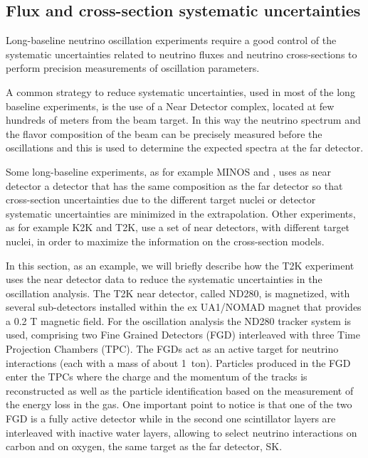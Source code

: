  

\subsection{Flux and cross-section systematic uncertainties}
\label{sec:beamsyst}

Long-baseline neutrino oscillation experiments require a good control of the systematic uncertainties related to neutrino fluxes and neutrino cross-sections to perform precision measurements of oscillation parameters. 

A common strategy to reduce systematic uncertainties, used in most of the long baseline experiments, is the use of a Near Detector complex, located at few hundreds of meters from the beam target. In this way the neutrino spectrum and the flavor composition of the beam can be precisely measured before the oscillations and this is used to determine the expected spectra at the far detector.

Some long-baseline experiments, as for example MINOS and \nova, uses as near detector a detector that has the same composition as the far detector so that cross-section uncertainties due to the different target nuclei or detector systematic uncertainties are minimized in the extrapolation. Other experiments, as for example K2K and T2K, use a set of near detectors, with different target nuclei, in order to maximize the information on the cross-section models.

In this section, as an example, we will briefly describe how the T2K experiment uses the near detector data to reduce the systematic uncertainties in the oscillation analysis. The T2K near detector, called ND280, is magnetized, with several sub-detectors installed within the ex UA1/NOMAD magnet that provides a 0.2 T magnetic field. For the oscillation analysis the ND280 tracker system is used, comprising two Fine Grained Detectors (FGD) interleaved with three Time Projection Chambers (TPC). The FGDs act as an active target for neutrino interactions (each with a mass of about 1~ton). Particles produced in the FGD enter the TPCs where the charge and the momentum of the tracks is reconstructed as well as the particle identification based on the measurement of the energy loss in the gas. One important point to notice is that one of the two FGD is a fully active detector while in the second one scintillator layers are interleaved with inactive water layers, allowing to select neutrino interactions on carbon and on oxygen, the same target as the far detector, SK. 
    
